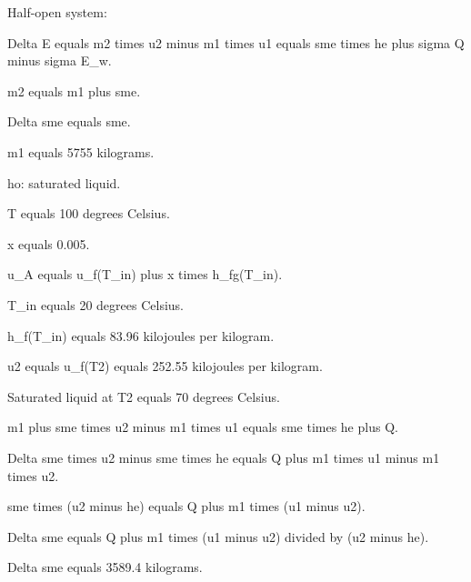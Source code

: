Half-open system:  

Delta E equals m2 times u2 minus m1 times u1 equals sme times he plus sigma Q minus sigma E_w.  

m2 equals m1 plus sme.  

Delta sme equals sme.  

m1 equals 5755 kilograms.  

ho: saturated liquid.  

T equals 100 degrees Celsius.  

x equals 0.005.  

u_A equals u_f(T_in) plus x times h_fg(T_in).  

T_in equals 20 degrees Celsius.  

h_f(T_in) equals 83.96 kilojoules per kilogram.  

u2 equals u_f(T2) equals 252.55 kilojoules per kilogram.  

Saturated liquid at T2 equals 70 degrees Celsius.  

m1 plus sme times u2 minus m1 times u1 equals sme times he plus Q.  

Delta sme times u2 minus sme times he equals Q plus m1 times u1 minus m1 times u2.  

sme times (u2 minus he) equals Q plus m1 times (u1 minus u2).  

Delta sme equals Q plus m1 times (u1 minus u2) divided by (u2 minus he).  

Delta sme equals 3589.4 kilograms.